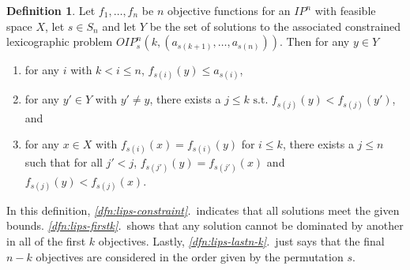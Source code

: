 \documentclass{amsart}
\theoremstyle{definition}
\newtheorem{dfn}{Definition}
\begin{document}
\begin{dfn}\label{dfn:lips}
  Let $f_1, \ldots, f_n$ be $n$ objective functions for an ${I\!P}^n$ with feasible space $X$, let $s\in S_n$ and let $Y$ be the set of solutions to the associated constrained lexicographic problem ${O\!I\!P}_s^n(k, (a_{s(k+1)}, \ldots, a_{s(n)}))$.
Then for any $y \in Y$

\begin{enumerate}
  \item for any $i$ with $k < i \leq n$, $f_{s(i)}(y) \leq a_{s(i)}$, \label{dfn:lips-constraint}
  \item for any $y' \in Y$ with $y' \neq y$, there exists a $j \leq k {\text{ s.t. }} f_{s(j)}(y) < f_{s(j)}(y')$, and \label{dfn:lips-firstk}
  \item for any $x \in X$ with $f_{s(i)}(x) = f_{s(i)}(y)$ for $i \leq k$, there exists a $j \leq n$ such that for all $j' < j$, $f_{s(j')}(y) = f_{s(j')}(x)$ and $f_{s(j)}(y) < f_{s(j)}(x)$. \label{dfn:lips-lastn-k}
\end{enumerate}

\end{dfn}

In this definition, \emph{\ref{dfn:lips-constraint}.}\ indicates that all solutions meet the given bounds.
\emph{\ref{dfn:lips-firstk}.}\ shows that any solution cannot be dominated by another in all of the first $k$ objectives.
Lastly, \emph{\ref{dfn:lips-lastn-k}.}\ just says that the final $n-k$ objectives are considered in the order given by the permutation $s$.
\end{document}
